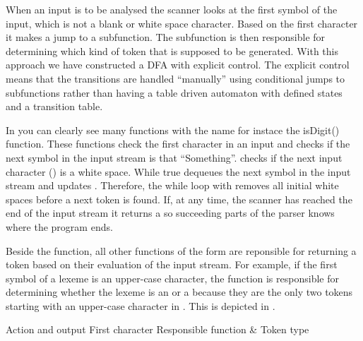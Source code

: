 When an input is to be analysed the scanner looks at the first symbol of the input, which is not a blank or white space character. Based on the first character it makes a jump to a subfunction. The subfunction is then responsible for determining which kind of token that is supposed to be generated. With this approach we have constructed a DFA with explicit control. The explicit control means that the transitions are handled ``manually'' using conditional jumps to subfunctions rather than having a table driven automaton with defined states and a transition table.

In  you can clearly see many functions with the name  for instace the isDigit() function. These functions check the first character in an input and checks if the next symbol in the input stream is that ``{Something}''.  checks if the next input character () is a white space. While true  dequeues the next symbol in the input stream and updates . Therefore, the while loop with  removes all initial white spaces before a next token is found. If, at any time, the scanner has reached the end of the input stream it returns a  so succeeding parts of the parser knows where the program ends.

Beside the  function, all other functions of the form  are reponsible for returning a token based on their evaluation of the input stream.
For example, if the first symbol of a lexeme is an upper-case character, the function  is responsible for determining whether the lexeme is an  or a  because they are the only two tokens starting with an upper-case character in \productname{}. This is depicted in . 


                 		 {Action and output												}
       {First character	}{Responsible function	& Token type							}{
}


